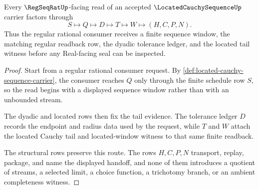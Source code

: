 \begin{theorem}\label{thm:located-cauchy-sequence-regseqrat-handoff}
Every $\RegSeqRatUp$-facing read of an accepted $\LocatedCauchySequenceUp$ carrier factors through
$$
S\longmapsto Q\longmapsto D\longmapsto T\longmapsto W\longmapsto(H,C,P,N).
$$
Thus the regular rational consumer receives a finite sequence window, the matching regular readback row, the dyadic tolerance ledger, and the located tail witness before any Real-facing seal can be inspected.
\end{theorem}
\begin{proof}
Start from a regular rational consumer request. By \autoref{def:located-cauchy-sequence-carrier}, the consumer reaches $Q$ only through the finite schedule row $S$, so the read begins with a displayed sequence window rather than with an unbounded stream.

The dyadic and located rows then fix the tail evidence. The tolerance ledger $D$ records the endpoint and radius data used by the request, while $T$ and $W$ attach the located Cauchy tail and located-window witness to that same finite readback.

The structural rows preserve this route. The rows $H,C,P,N$ transport, replay, package, and name the displayed handoff, and none of them introduces a quotient of streams, a selected limit, a choice function, a trichotomy branch, or an ambient completeness witness.
\end{proof}

